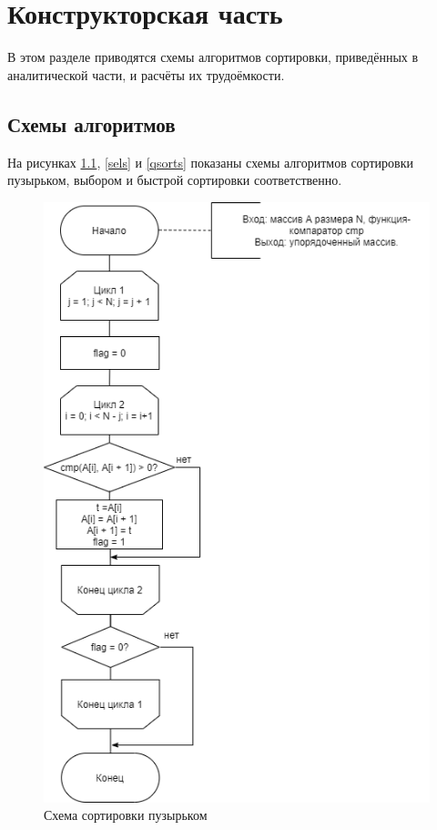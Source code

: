 \documentclass[12pt]{report}
\begin{document}
\chapter{Конструкторская часть}

В этом разделе приводятся схемы алгоритмов сортировки, приведённых в аналитической части, и расчёты их трудоёмкости. 

\section{Схемы алгоритмов}

На рисунках \ref{bubs}, \ref{sels} и \ref{qsorts} показаны схемы алгоритмов сортировки пузырьком, выбором и быстрой сортировки соответственно.

\begin{figure}[H]
	\raggedleft
	\includegraphics[scale = 0.53]{bsort.png}
	\caption{Схема сортировки пузырьком}
	\label{bubs}
\end{figure}
\end{document}
